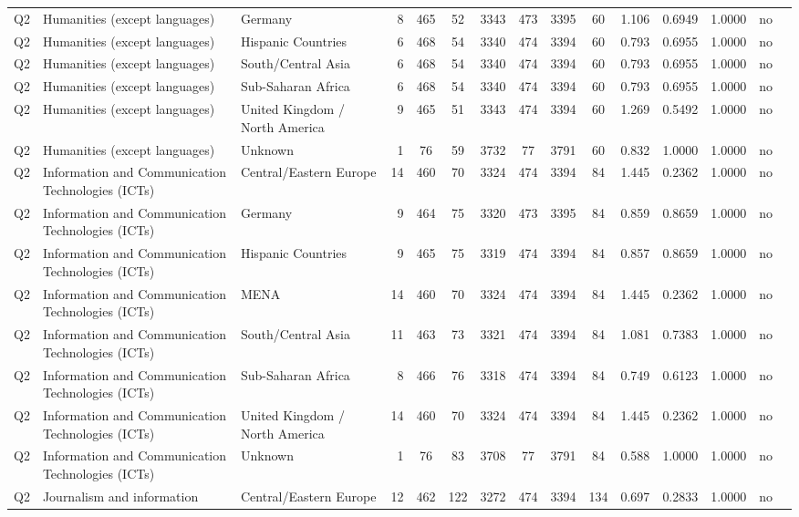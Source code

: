 \begin{longtable}{lllrcccccccccll}
Q2 & Humanities (except languages) & Germany & 8 & 465 & 52 & 3343 & 473 & 3395 & 60 & 1.106 & 0.6949 & 1.0000 & no \\
Q2 & Humanities (except languages) & Hispanic Countries & 6 & 468 & 54 & 3340 & 474 & 3394 & 60 & 0.793 & 0.6955 & 1.0000 & no \\
Q2 & Humanities (except languages) & South/Central Asia & 6 & 468 & 54 & 3340 & 474 & 3394 & 60 & 0.793 & 0.6955 & 1.0000 & no \\
Q2 & Humanities (except languages) & Sub-Saharan Africa & 6 & 468 & 54 & 3340 & 474 & 3394 & 60 & 0.793 & 0.6955 & 1.0000 & no \\
Q2 & Humanities (except languages) & United Kingdom / North America & 9 & 465 & 51 & 3343 & 474 & 3394 & 60 & 1.269 & 0.5492 & 1.0000 & no \\
Q2 & Humanities (except languages) & Unknown & 1 & 76 & 59 & 3732 & 77 & 3791 & 60 & 0.832 & 1.0000 & 1.0000 & no \\
Q2 & Information and Communication Technologies (ICTs) & Central/Eastern Europe & 14 & 460 & 70 & 3324 & 474 & 3394 & 84 & 1.445 & 0.2362 & 1.0000 & no \\
Q2 & Information and Communication Technologies (ICTs) & Germany & 9 & 464 & 75 & 3320 & 473 & 3395 & 84 & 0.859 & 0.8659 & 1.0000 & no \\
Q2 & Information and Communication Technologies (ICTs) & Hispanic Countries & 9 & 465 & 75 & 3319 & 474 & 3394 & 84 & 0.857 & 0.8659 & 1.0000 & no \\
Q2 & Information and Communication Technologies (ICTs) & MENA & 14 & 460 & 70 & 3324 & 474 & 3394 & 84 & 1.445 & 0.2362 & 1.0000 & no \\
Q2 & Information and Communication Technologies (ICTs) & South/Central Asia & 11 & 463 & 73 & 3321 & 474 & 3394 & 84 & 1.081 & 0.7383 & 1.0000 & no \\
Q2 & Information and Communication Technologies (ICTs) & Sub-Saharan Africa & 8 & 466 & 76 & 3318 & 474 & 3394 & 84 & 0.749 & 0.6123 & 1.0000 & no \\
Q2 & Information and Communication Technologies (ICTs) & United Kingdom / North America & 14 & 460 & 70 & 3324 & 474 & 3394 & 84 & 1.445 & 0.2362 & 1.0000 & no \\
Q2 & Information and Communication Technologies (ICTs) & Unknown & 1 & 76 & 83 & 3708 & 77 & 3791 & 84 & 0.588 & 1.0000 & 1.0000 & no \\
Q2 & Journalism and information & Central/Eastern Europe & 12 & 462 & 122 & 3272 & 474 & 3394 & 134 & 0.697 & 0.2833 & 1.0000 & no \\

\end{longtable}

